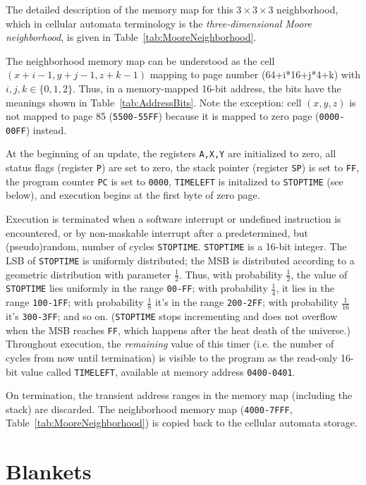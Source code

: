 \documentclass{article}
\newcommand\hex[1]{{\tt #1}}
\newcommand\hexrange[2]{\hex{#1}{\tt -}\hex{#2}}
\begin{document}
The detailed description of the memory map for this $3 \times 3 \times 3$ neighborhood,
which in cellular automata terminology is
the {\em three-dimensional Moore neighborhood},
is given in Table~\ref{tab:MooreNeighborhood}.

The neighborhood memory map can be understood as the cell $(x+i-1,y+j-1,z+k-1)$
mapping to page number (64+i*16+j*4+k) with $i,j,k \in \{0,1,2\}$.
Thus, in a memory-mapped 16-bit address, the bits have the meanings shown in Table~\ref{tab:AddressBits}.
Note the exception: cell $(x,y,z)$ is not mapped to page 85 (\hexrange{5500}{55FF})
because it is mapped to zero page (\hexrange{0000}{00FF}) instead.

At the beginning of an update,
the registers {\tt A,X,Y} are initialized to zero,
all status flags (register {\tt P}) are set to zero,
the stack pointer (register {\tt SP}) is set to \hex{FF},
the program counter {\tt PC} is set to \hex{0000},
{\tt TIMELEFT} is initalized to {\tt STOPTIME} (see below),
and execution begins at the first byte of zero page.

Execution is terminated
when a software interrupt or undefined instruction is encountered,
or by non-maskable interrupt after a predetermined, but (pseudo)random, number of cycles {\tt STOPTIME}.
{\tt STOPTIME} is a 16-bit integer.
The LSB of {\tt STOPTIME} is uniformly distributed;
the MSB is distributed according to a geometric distribution with parameter $\frac{1}{2}$.
Thus, with probability $\frac{1}{2}$, the value of {\tt STOPTIME} lies uniformly in the range \hexrange{00}{FF};
with probability $\frac{1}{4}$, it lies in the range \hexrange{100}{1FF};
with probability $\frac{1}{8}$ it's in the range \hexrange{200}{2FF};
with probability $\frac{1}{16}$ it's \hexrange{300}{3FF};
and so on.
({\tt STOPTIME} stops incrementing and does not overflow when the MSB reaches \hex{FF},
which happens after the heat death of the universe.)
Throughout execution, the {\em remaining} value of this timer
(i.e. the number of cycles from now until termination)
is visible to the program
as the read-only 16-bit value called {\tt TIMELEFT},
available at memory address \hexrange{0400}{0401}.

On termination, the transient address ranges in the memory map
(including the stack)
are discarded.
The neighborhood memory map (\hexrange{4000}{7FFF}, Table~\ref{tab:MooreNeighborhood})
is copied back to the cellular automata storage.

\section{Blankets}
\label{sec:Blankets}
\end{document}
